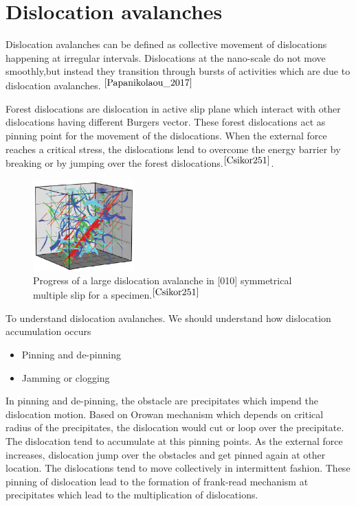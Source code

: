\section{Dislocation avalanches}Dislocation avalanches can be defined as collective movement of dislocations happening at irregular intervals. 
Dislocations at the nano-scale do not move smoothly,but instead they transition through bursts of activities which are due to dislocation avalanches. $^{\cite{Papanikolaou_2017}}$

Forest dislocations are dislocation in active slip plane which interact with other dislocations having different Burgers vector. These forest dislocations act as pinning point for the movement of the dislocations. When the external force reaches a critical stress, the dislocations lend to overcome the energy barrier by breaking or by jumping over the forest dislocations.$^{\cite{Csikor251}}$.


\begin{figure}
\centering
\includegraphics[width=0.35\textwidth]{section_2_1.png}
\caption{\label{fig:Dislocation avalanches}Progress of a large
dislocation avalanche in [010] symmetrical multiple slip for a specimen.$^{\cite{Csikor251}}$}
\end{figure}


To understand dislocation avalanches. We should understand how dislocation accumulation occurs
\begin{itemize}
  \item Pinning and de-pinning
  \item Jamming or clogging
\end{itemize} 


In pinning and de-pinning, the obstacle are precipitates which impend the dislocation motion. Based on Orowan mechanism which depends on critical radius of the precipitates, the dislocation would cut or loop over the precipitate. The dislocation tend to accumulate at this pinning points. As the external force increases, dislocation jump over the obstacles and get pinned again at other location. The dislocations tend to move collectively in intermittent fashion.
These pinning of dislocation lead to the formation of frank-read mechanism at precipitates which lead to the multiplication of dislocations.

